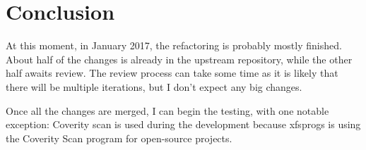 
\chapter{Conclusion} \label{chap:conclusion}

At this moment, in January 2017, the refactoring is probably mostly finished. About half of the changes is already in the upstream repository, while the other half awaits review. The review process can take some time as it is likely that there will be multiple iterations, but I don't expect any big changes.

Once all the changes are merged, I can begin the testing, with one notable exception: Coverity scan is used during the development because xfsprogs is using the Coverity Scan program for open-source projects.

